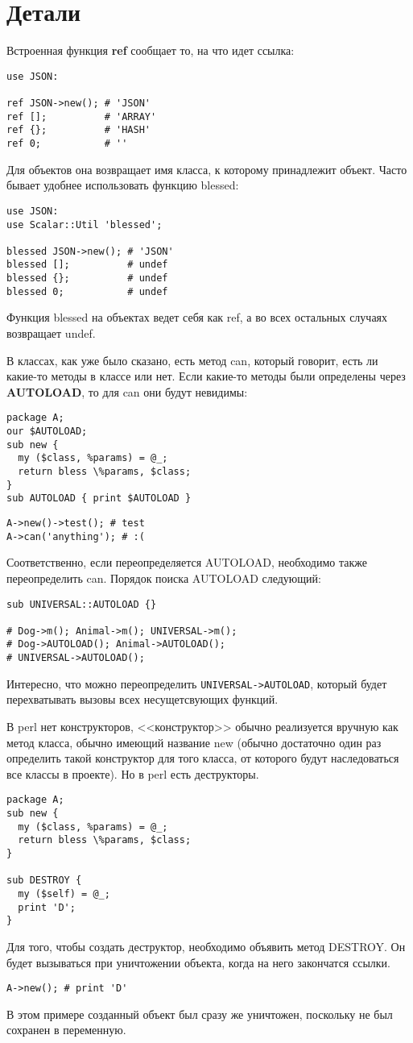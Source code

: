 \section{Детали} %
Встроенная функция \textbf{ref} сообщает то, на что идет ссылка:
\begin{verbatim}
use JSON:

ref JSON->new(); # 'JSON'
ref [];          # 'ARRAY'
ref {};          # 'HASH'
ref 0;           # ''
\end{verbatim}
Для объектов она возвращает имя класса, к которому принадлежит объект. Часто бывает удобнее использовать функцию blessed:
\begin{verbatim}
use JSON:
use Scalar::Util 'blessed';

blessed JSON->new(); # 'JSON'
blessed [];          # undef
blessed {};          # undef
blessed 0;           # undef
\end{verbatim}
Функция blessed на объектах ведет себя как ref, а во всех остальных случаях возвращает undef.

В классах, как уже было сказано, есть метод can, который говорит, есть ли какие-то методы в классе или нет. Если какие-то методы были определены через \textbf{AUTOLOAD}, то для can они будут невидимы:
\begin{verbatim}
package A;
our $AUTOLOAD;
sub new {
  my ($class, %params) = @_;
  return bless \%params, $class;
}
sub AUTOLOAD { print $AUTOLOAD }
\end{verbatim}
\begin{verbatim}
A->new()->test(); # test
A->can('anything'); # :(
\end{verbatim}
Соответственно, если переопределяется AUTOLOAD, необходимо также переопределить can. Порядок поиска AUTOLOAD следующий:
\begin{verbatim}
sub UNIVERSAL::AUTOLOAD {}

# Dog->m(); Animal->m(); UNIVERSAL->m();
# Dog->AUTOLOAD(); Animal->AUTOLOAD();
# UNIVERSAL->AUTOLOAD();
\end{verbatim}
Интересно, что можно переопределить \verb|UNIVERSAL->AUTOLOAD|, который будет перехватывать вызовы всех несущетсвующих функций.

В perl нет конструкторов, <<конструктор>> обычно реализуется вручную как метод класса, обычно имеющий название new (обычно достаточно один раз определить такой конструктор для того класса, от которого будут наследоваться все классы в проекте). Но в perl есть деструкторы.
\begin{verbatim}
package A;
sub new {
  my ($class, %params) = @_;
  return bless \%params, $class;
}

sub DESTROY {
  my ($self) = @_;
  print 'D';
}
\end{verbatim}
Для того, чтобы создать деструктор, необходимо объявить метод DESTROY. Он будет вызываться при уничтожении объекта, когда на него закончатся ссылки.
\begin{verbatim}
A->new(); # print 'D'
\end{verbatim}
В этом примере созданный объект был сразу же уничтожен, поскольку не был сохранен в переменную.

